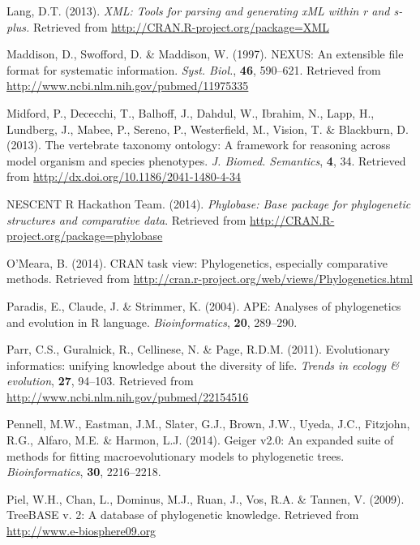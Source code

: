\documentclass[author-year, review, 11pt]{components/elsarticle} %
\begin{document}
\hypertarget{ref-XML}{}
Lang, D.T. (2013). \emph{XML: Tools for parsing and generating xML
within r and s-plus.} Retrieved from
\url{http://CRAN.R-project.org/package=XML}

\hypertarget{ref-Maddisonux5f1997}{}
Maddison, D., Swofford, D. \& Maddison, W. (1997). NEXUS: An extensible
file format for systematic information. \emph{Syst. Biol.}, \textbf{46},
590--621. Retrieved from
\url{http://www.ncbi.nlm.nih.gov/pubmed/11975335}

\hypertarget{ref-Midford2013}{}
Midford, P., Dececchi, T., Balhoff, J., Dahdul, W., Ibrahim, N., Lapp,
H., Lundberg, J., Mabee, P., Sereno, P., Westerfield, M., Vision, T. \&
Blackburn, D. (2013). The vertebrate taxonomy ontology: A framework for
reasoning across model organism and species phenotypes. \emph{J. Biomed.
Semantics}, \textbf{4}, 34. Retrieved from
\url{http://dx.doi.org/10.1186/2041-1480-4-34}

\hypertarget{ref-phylobase}{}
NESCENT R Hackathon Team. (2014). \emph{Phylobase: Base package for
phylogenetic structures and comparative data}. Retrieved from
\url{http://CRAN.R-project.org/package=phylobase}

\hypertarget{ref-taskview}{}
O'Meara, B. (2014). CRAN task view: Phylogenetics, especially
comparative methods. Retrieved from
\url{http://cran.r-project.org/web/views/Phylogenetics.html}

\hypertarget{ref-Paradisux5f2004}{}
Paradis, E., Claude, J. \& Strimmer, K. (2004). APE: Analyses of
phylogenetics and evolution in R language. \emph{Bioinformatics},
\textbf{20}, 289--290.

\hypertarget{ref-Parr2011}{}
Parr, C.S., Guralnick, R., Cellinese, N. \& Page, R.D.M. (2011).
Evolutionary informatics: unifying knowledge about the diversity of
life. \emph{Trends in ecology \& evolution}, \textbf{27}, 94--103.
Retrieved from \url{http://www.ncbi.nlm.nih.gov/pubmed/22154516}

\hypertarget{ref-Pennell2014}{}
Pennell, M.W., Eastman, J.M., Slater, G.J., Brown, J.W., Uyeda, J.C.,
Fitzjohn, R.G., Alfaro, M.E. \& Harmon, L.J. (2014). Geiger v2.0: An
expanded suite of methods for fitting macroevolutionary models to
phylogenetic trees. \emph{Bioinformatics}, \textbf{30}, 2216--2218.

\hypertarget{ref-Pielux5f2009}{}
Piel, W.H., Chan, L., Dominus, M.J., Ruan, J., Vos, R.A. \& Tannen, V.
(2009). TreeBASE v. 2: A database of phylogenetic knowledge. Retrieved
from \url{http://www.e-biosphere09.org}
\end{document}
